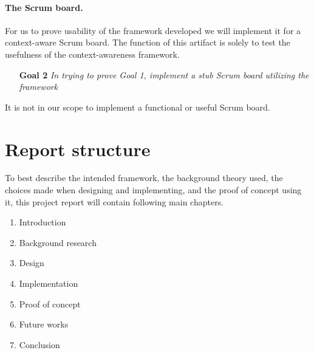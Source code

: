 \documentclass[../report.tex]{subfiles}
\begin{document}
\paragraph{The Scrum board.} 
For us to prove usability of the framework developed we will implement it for a context-aware Scrum board. The function of this artifact is solely to test the usefulness of the context-awareness framework.\\

\begin{itemize}
\item[\textbf{Goal 2}] \textit{In trying to prove Goal 1, implement a stub Scrum board utilizing the framework}
\end{itemize}

It is not in our scope to implement a functional or useful Scrum board.

\section{Report structure}

To best describe the intended framework, the background theory used, the choices made when designing and implementing, and the proof of concept using it, this project report will contain following main chapters.

\begin{enumerate}
\item Introduction
\item Background research
\item Design
\item Implementation
\item Proof of concept
\item Future works
\item Conclusion
\end{enumerate}
\end{document}
